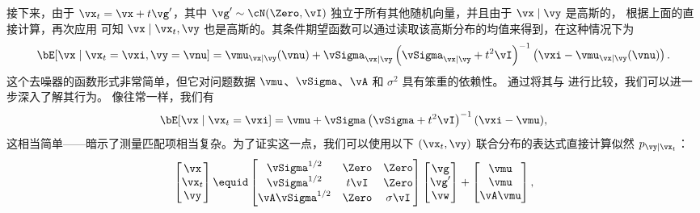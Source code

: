 \documentclass[../../book-main_zh.tex]{subfiles}
\begin{document}
\begin{example}
    接下来，由于 $\vx_t = \vx + t \vg'$，其中 $\vg' \sim \cN(\Zero, \vI)$ 
    独立于所有其他随机向量，并且由于 $\vx \mid \vy$
    是高斯的，
    根据上面的直接计算，再次应用  可知 $\vx
    \mid \vx_t, \vy$
    也是高斯的。其条件期望函数可以通过读取该高斯分布的均值来得到，在这种情况下为
    \begin{equation}\label{eq:conditional-posterior-denoiser-gaussian-case}
        \bE[ \vx \mid \vx_t=\vxi, \vy=\vnu ]
        =
        \vmu_{\vx\mid \vy}(\vnu) + \vSigma_{\vx\mid\vy}\left(
            \vSigma_{\vx\mid \vy} + t^2 \vI
        \right)^{-1}\left(
            \vxi - \vmu_{\vx\mid \vy}(\vnu)
        \right).
    \end{equation}
    这个去噪器的函数形式非常简单，但它对问题数据 $\vmu$、$\vSigma$、$\vA$ 和
    $\sigma^2$ 具有笨重的依赖性。
    通过将其与
     进行比较，我们可以进一步深入了解其行为。
    像往常一样，我们有
    \begin{equation}\label{eq:posterior-denoiser-gaussian-case}
        \bE[\vx \mid \vx_t=\vxi]
        = \vmu + \vSigma\left(\vSigma + t^2 \vI\right)^{-1} (\vxi - \vmu),
    \end{equation}
    这相当简单——暗示了测量匹配项相当复杂。为了证实这一点，我们可以使用以下 $(\vx_t, \vy)$ 联合分布的表达式直接计算似然 $p_{\vy
    \mid \vx_t}$：
    \begin{equation}
        \begin{bmatrix}
            \vx \\
            \vx_t \\
            \vy
        \end{bmatrix}
        \equid
        \begin{bmatrix}
            \vSigma^{1/2} & \Zero & \Zero \\
            \vSigma^{1/2} & t\vI & \Zero \\
            \vA \vSigma^{1/2} & \Zero & \sigma \vI
        \end{bmatrix}
        \begin{bmatrix}
            \vg \\
            \vg' \\
            \vw
        \end{bmatrix}
        +
        \begin{bmatrix}
            \vmu \\
            \vmu \\
            \vA\vmu
        \end{bmatrix},

\end{equation}
\end{example}
\end{document}
